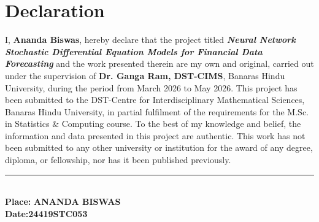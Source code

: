 \vspace{3em}
\section*{\centering \huge Declaration}
\vspace{3em}
\begin{large}
	I, \textbf{Ananda Biswas}, hereby declare that the project titled \emph{\textbf{Neural Network Stochastic Differential Equation Models for Financial Data Forecasting}} and the work presented therein are my own and original, carried out under the supervision of \textbf{Dr. Ganga Ram, DST-CIMS}, Banaras Hindu University, during the period from March 2026 to May 2026. This project has been submitted to the DST-Centre for Interdisciplinary Mathematical Sciences, Banaras Hindu University, in partial fulfilment of the requirements for the M.Sc. in Statistics $\&$ Computing course. To the best of my knowledge and belief, the information and data presented in this project are authentic. This work has not been submitted to any other university or institution for the award of any degree, diploma, or fellowship, nor has it been published previously.
	
	\vspace{5em}
\begin{flushright}
	\rule[.1em]{12em}{1pt}\\
	\textbf{Place:} \hfill \textbf{ANANDA BISWAS}\\
	\textbf{Date:}\hfill \textbf{24419STC053}
\end{flushright}
\clearpage
\end{large}

\newpage

